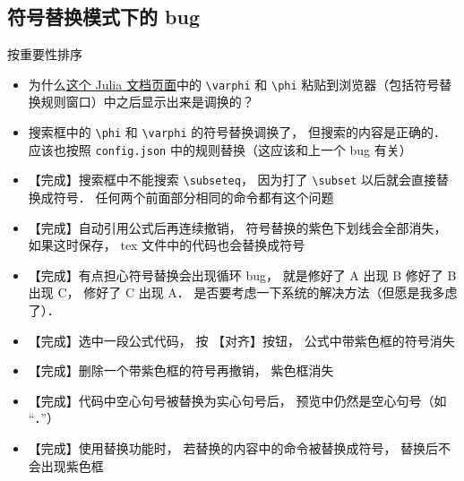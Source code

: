 
\subsection{符号替换模式下的 bug}
按重要性排序
\begin{itemize}

\item 为什么\href{https://docs.julialang.org/en/v1/manual/unicode-input/}{这个 Julia 文档页面}中的 \lstinline|\varphi| 和 \lstinline|\phi| 粘贴到浏览器（包括符号替换规则窗口）中之后显示出来是调换的？

\item 搜索框中的 \lstinline|\phi| 和 \lstinline|\varphi| 的符号替换调换了， 但搜索的内容是正确的． 应该也按照 \lstinline|config.json| 中的规则替换（这应该和上一个 bug 有关）

\item 【完成】搜索框中不能搜索 \lstinline|\subseteq|， 因为打了 \lstinline|\subset| 以后就会直接替换成符号． 任何两个前面部分相同的命令都有这个问题

\item 【完成】自动引用公式后再连续撤销， 符号替换的紫色下划线会全部消失， 如果这时保存， tex 文件中的代码也会替换成符号

\item 【完成】有点担心符号替换会出现循环 bug， 就是修好了 A 出现 B 修好了 B 出现 C， 修好了 C 出现 A． 是否要考虑一下系统的解决方法（但愿是我多虑了）．

\item 【完成】选中一段公式代码， 按 【对齐】按钮， 公式中带紫色框的符号消失

\item 【完成】删除一个带紫色框的符号再撤销， 紫色框消失

\item 【完成】代码中空心句号被替换为实心句号后， 预览中仍然是空心句号（如 “．”）

\item 【完成】使用替换功能时， 若替换的内容中的命令被替换成符号， 替换后不会出现紫色框
\end{itemize}

